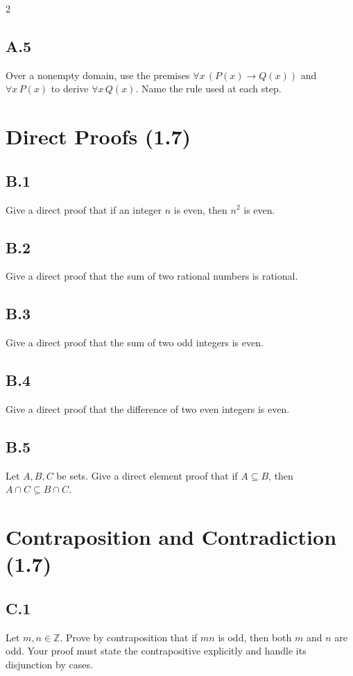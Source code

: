 \documentclass{article}
\begin{document}
\begin{multicols}{2}
\subsection*{A.5}
Over a nonempty domain, use the premises
$\forall x\,(P(x)\to Q(x))$ and $\forall x\,P(x)$ to derive
$\forall x\,Q(x)$. Name the rule used at each step.

\section*{Direct Proofs (1.7)}

\subsection*{B.1}
Give a direct proof that if an integer $n$ is even, then $n^2$ is even.

\subsection*{B.2}
Give a direct proof that the sum of two rational numbers is rational.

\subsection*{B.3}
Give a direct proof that the sum of two odd integers is even.

\subsection*{B.4}
Give a direct proof that the difference of two even integers is even.

\subsection*{B.5}
Let $A,B,C$ be sets. Give a direct element proof that if $A\subseteq B$, then
$A\cap C\subseteq B\cap C$.

\section*{Contraposition and Contradiction (1.7)}

\subsection*{C.1}
Let $m,n\in\mathbb Z$. Prove by contraposition that if $mn$ is odd, then both
$m$ and $n$ are odd. Your proof must state the contrapositive explicitly and
handle its disjunction by cases.


\end{multicols}
\end{document}

